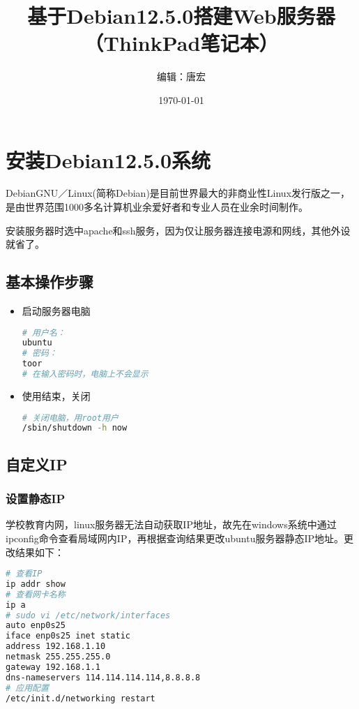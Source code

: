 \documentclass[UTF8,a4paper,12pt]{ctexbook} %
\title{基于Debian12.5.0搭建Web服务器\\
       （ThinkPad笔记本）}
\author{编辑：唐宏}
\date{\today}
\begin{document}
\maketitle
\setcounter{tocdepth}{1} %
\tableofcontents
\chapter{安装Debian12.5.0系统}
DebianGNU／Linux(简称Debian)是目前世界最大的非商业性Linux发行版之一，是由世界范围1000多名计算机业余爱好者和专业人员在业余时间制作。


安装服务器时选中apache和ssh服务，因为仅让服务器连接电源和网线，其他外设就省了。
\section{基本操作步骤}
\begin{itemize}
\item 启动服务器电脑
\begin{lstlisting}[language={bash}]
# 用户名：
ubuntu
# 密码：
toor
# 在输入密码时，电脑上不会显示
\end{lstlisting}
\item 使用结束，关闭
\begin{lstlisting}[language={bash}]
# 关闭电脑，用root用户
/sbin/shutdown -h now 
\end{lstlisting}
\end{itemize}

\section{自定义IP}
\subsection{设置静态IP}
学校教育内网，linux服务器无法自动获取IP地址，故先在windows系统中通过ipconfig命令查看局域网内IP，再根据查询结果更改ubuntu服务器静态IP地址。更改结果如下：
\begin{lstlisting}[language={bash}]
# 查看IP
ip addr show
# 查看网卡名称
ip a
# sudo vi /etc/network/interfaces
auto enp0s25
iface enp0s25 inet static
address 192.168.1.10
netmask 255.255.255.0
gateway 192.168.1.1
dns-nameservers 114.114.114.114,8.8.8.8
# 应用配置
/etc/init.d/networking restart
\end{lstlisting}
\end{document}
